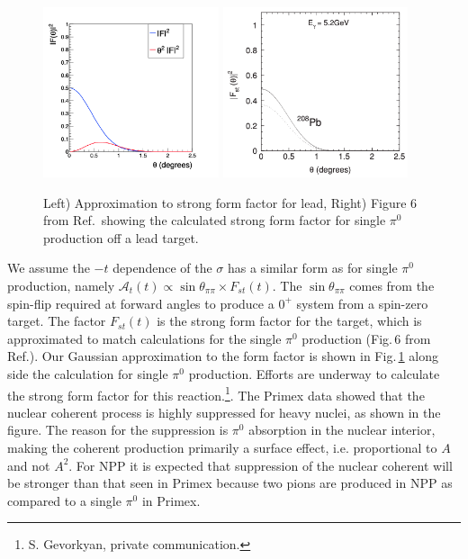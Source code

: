  \begin{figure}[tbh]
\begin{center}
\includegraphics[height=5cm,clip=true]{figures/fit_Primakoff_sigma_c1.png}
\includegraphics[height=5cm,clip=true]{figures/PRC80_2009_Fig6.png}
\caption{ Left) Approximation to strong form factor for lead, Right) Figure 6 from Ref.\,\cite{Gevorkyan:2009ge} showing the calculated strong form factor for single $\pi^0$ production off a lead target.
\label{fig:strongFF}}
\end{center}
\end{figure}

We assume the $-t$ dependence of the $\sigma$ has a similar form as for single $\pi^0$ production, namely $\mathcal{A}_t(t) \propto \sin{\theta_{\pi\pi}} \times F_{st}(t)$.  The $\sin{\theta_{\pi\pi}}$ 
comes from the spin-flip required at forward angles to produce a $0^+$ system from a spin-zero target. The factor $F_{st}(t)$ is the strong form factor for the target, which is approximated to
match calculations for the single $\pi^0$ production (Fig.\,6 from Ref.\cite{Gevorkyan:2009ge}). Our Gaussian approximation to the form factor is shown in Fig.\,\ref{fig:strongFF} along side the calculation for single 
$\pi^0$ production. Efforts are underway to calculate the strong form factor for this reaction.\footnote{S. Gevorkyan, private communication.}.
The Primex data showed that the nuclear coherent process is highly
suppressed for heavy nuclei, as shown in the figure.  The reason for the suppression is
$\pi^0$ absorption in the nuclear interior, making the coherent
production primarily a surface effect, i.e. proportional to $A$ and
not $A^2$.  For NPP it is expected that suppression of the nuclear  
coherent will be stronger than that seen in Primex because two pions
are produced in NPP as compared to a single $\pi^0$ in Primex.  

